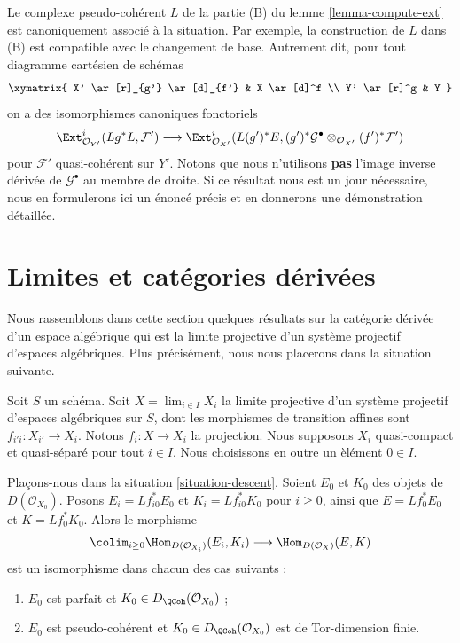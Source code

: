 \begin{remark}
\label{remark-base-change-of-L}
Le complexe pseudo-coh\'erent $L$ de la partie (B) du lemme
\ref{lemma-compute-ext} est canoniquement associ\'e \`a la situation. Par
exemple, la construction de $L$ dans (B) est compatible avec le changement de
base. Autrement dit, pour tout diagramme cart\'esien de sch\'emas
$$
\xymatrix{
X' \ar[r]_{g'} \ar[d]_{f'} &
X \ar[d]^f \\
Y' \ar[r]^g &
Y
}
$$
on a des isomorphismes canoniques fonctoriels
$$
\Ext^i_{\mathcal{O}_{Y'}}(Lg^*L, \mathcal{F}') \longrightarrow
\Ext^i_{\mathcal{O}_{X'}}(L(g')^*E,
(g')^*\mathcal{G}^\bullet \otimes_{\mathcal{O}_{X'}} (f')^*\mathcal{F}')
$$
pour $\mathcal{F}'$ quasi-coh\'erent sur $Y'$. Notons que nous n'utilisons
{\bf pas} l'image inverse d\'eriv\'ee de $\mathcal{G}^\bullet$ au membre de
droite. Si ce r\'esultat nous est un jour n\'ecessaire, nous en formulerons ici
un \'enonc\'e pr\'ecis et en donnerons une d\'emonstration d\'etaill\'ee.
\end{remark}

\section{Limites et cat\'egories d\'eriv\'ees}
\label{section-limits}

\noindent
Nous rassemblons dans cette section quelques r\'esultats sur la cat\'egorie
d\'eriv\'ee d'un espace alg\'ebrique qui est la limite projective d'un syst\`eme
projectif d'espaces alg\'ebriques. Plus pr\'ecis\'ement, nous nous placerons dans
la situation suivante.

\begin{situation}
\label{situation-descent}
Soit $S$ un sch\'ema. Soit $X=\lim_{i\in I}X_i$ la limite projective d'un syst\`eme
projectif d'espaces alg\'ebriques sur $S$, dont les morphismes de transition
affines sont $f_{i'i}:X_{i'}\to X_i$. Notons $f_i:X\to X_i$ la projection.
Nous supposons $X_i$ quasi-compact et quasi-s\'epar\'e pour tout $i\in I$.
Nous choisissons en outre un \`el\'ement $0\in I$.
\end{situation}

\begin{lemma}
\label{lemma-descend-homomorphisms}
Pla\c{c}ons-nous dans la situation \ref{situation-descent}. Soient $E_0$ et
$K_0$ des objets de $D(\mathcal{O}_{X_0})$. Posons
$E_i=Lf_{i0}^*E_0$ et $K_i=Lf_{i0}^*K_0$ pour $i\geq0$, ainsi que
$E=Lf_0^*E_0$ et $K=Lf_0^*K_0$. Alors le morphisme
$$
\colim_{i \geq 0} \Hom_{D(\mathcal{O}_{X_i})}(E_i, K_i)
\longrightarrow
\Hom_{D(\mathcal{O}_X)}(E, K)
$$
est un isomorphisme dans chacun des cas suivants :
\begin{enumerate}
\item $E_0$ est parfait et $K_0\in D_\QCoh(\mathcal{O}_{X_0})$ ;
\item $E_0$ est pseudo-coh\'erent et
$K_0\in D_\QCoh(\mathcal{O}_{X_0})$ est de Tor-dimension finie.
\end{enumerate}
\end{lemma}


